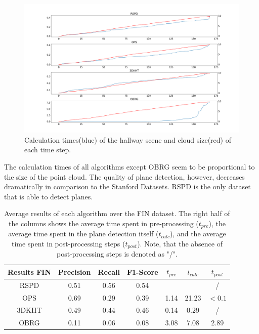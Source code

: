 \documentclass[main.tex]{subfiles}
\begin{document}
\begin{figure}[]
    \centering
    \includegraphics[width=\textwidth]{images/dyn_time-hallway.png}
    \caption[Time Results Hallway]{Calculation times(blue) of the hallway scene and cloud size(red) of each time step.}
    \label{fig:dynhallway}
\end{figure}

The calculation times of all algorithms except OBRG seem to be proportional to the size of the point cloud.
The quality of plane detection, however, decreases dramatically in comparison to the Stanford Datasets. RSPD is the only dataset that
is able to detect planes. %

\begin{table}[H]
    \centering
    \begin{tabular}{c|cccccc}
        Results FIN & Precision & Recall & F1-Score & $t_{pre}$ & $t_{calc}$ & $t_{post}$ \\ \hline
        RSPD        & 0.51      & 0.56   & 0.54     &           &            & /          \\
        OPS         & 0.69      & 0.29   & 0.39     & 1.14      & 21.23      & $<0.1$     \\
        3DKHT       & 0.49      & 0.44   & 0.46     & 0.14      & 0.29       & /          \\
        OBRG        & 0.11      & 0.06   & 0.08     & 3.08      & 7.08       & 2.89
    \end{tabular}
    \caption[Overall 2D-3D-S Results]{Average results of each algorithm over the FIN dataset. The right half of the columns shows the average time spent in
        pre-processing ($t_{pre}$), the average time spent in the plane detection itself ($t_{calc}$), and the average time spent in post-processing steps ($t_{post}$).
        Note, that the absence of post-processing steps is denoted as "/".}
    \label{tab:res-fin-total}
\end{table}
\end{document}
